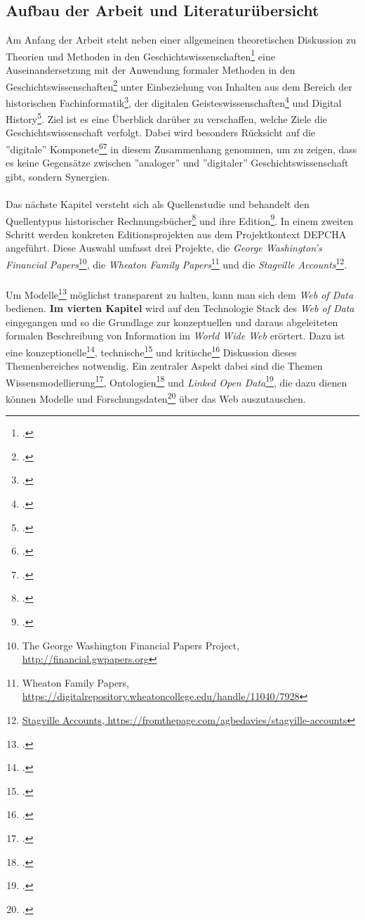 \documentclass[12pt,a4paper]{article}
\begin{document}
\subsection{Aufbau der Arbeit und Literaturübersicht}
Am Anfang der Arbeit steht neben einer allgemeinen theoretischen Diskussion zu Theorien und Methoden in den Geschichtswissenschaften\footcite{jordan2018theorien} eine Auseinandersetzung mit der Anwendung formaler Methoden in den Geschichtswissenschaften\footcite{thaller2017ungefahre} unter Einbeziehung von Inhalten aus dem Bereich der historischen Fachinformatik\footcite{thaller2017historical}, der digitalen Geisteswissenschaften\footcite{jannidis2017digital} und Digital History\footcite{graham2015exploring}. Ziel ist es eine Überblick darüber zu verschaffen, welche Ziele die Geschichtswissenschaft verfolgt. Dabei wird besonders Rücksicht auf die ''digitale'' Komponete\footcite{fohr2017historische}\footcite{wintergrun2019netzwerkanalysen} in diesem Zusammenhang genommen, um zu zeigen, dass es keine Gegensätze zwischen ''analoger'' und ''digitaler'' Geschichtswissenschaft gibt, sondern Synergien.
\\
\\
Das nächste Kapitel versteht sich als Quellenstudie und behandelt den Quellentypus historischer Rechnungsbücher\footcite{gleba2015wirtschafts} und ihre Edition\footcite{vogeler2015mittelalterliche}. In einem zweiten Schritt werden konkreten Editionsprojekten aus dem Projektkontext DEPCHA angeführt. Diese Auswahl umfasst drei Projekte, die \textit{George Washington’s Financial Papers}\footnote{The George Washington Financial Papers Project, \url{http://financial.gwpapers.org}}, die \textit{Wheaton Family Papers}\footnote{Wheaton Family Papers, \url{https://digitalrepository.wheatoncollege.edu/handle/11040/7928}} und die \textit{Stagville Accounts}\footnote{\url{Stagville Accounts, https://fromthepage.com/agbedavies/stagville-accounts}}.
\\
\\
Um Modelle\footcite[Dem Modellbegriff folgend nach:][]{stachowiak1973allgemeine}  möglichst transparent zu halten, kann man sich dem \textit{Web of Data} bedienen. \textbf{Im vierten Kapitel} wird auf den Technologie Stack des \textit{Web of Data} eingegangen und so die Grundlage zur konzeptuellen und daraus abgeleiteten formalen Beschreibung von Information im \textit{World Wide Web} erörtert. Dazu ist eine konzeptionelle\footcite{berners2001semantic}, technische\footcite{bernstein2016new} und kritische\footcite{swartz2013aaron} Diskussion dieses Themenbereiches notwendig. Ein zentraler Aspekt dabei sind die Themen Wissensmodellierung\footcite{kelly2016practical}, Ontologien\footcite{stuckenschmidt2009ontologien} und \textit{Linked Open Data}\footcite{bauer2011linked}, die dazu dienen können Modelle und Forschungsdaten\footcite{neher2011semantische} über das Web auszutauschen.
\end{document}

